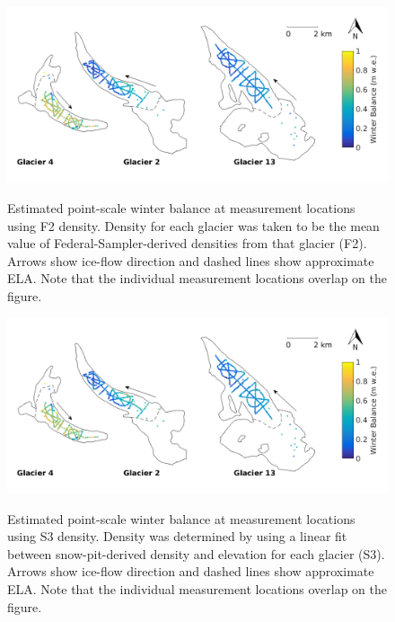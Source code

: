 \documentclass{sfuthesis}
\begin{document}
\begin{figure}[H]
	\centering
	\includegraphics[width = \textwidth]{SWEmap_opt5.png}\\
	\caption[Estimated point-scale winter balance at measurement locations using F2 density]{Estimated point-scale winter balance at measurement locations using F2 density. Density for each glacier was taken to be the mean value of Federal-Sampler-derived densities from that glacier (F2). Arrows show ice-flow direction and dashed lines show approximate ELA. Note that the individual measurement locations overlap on the figure.}
	\label{fig:SWEmap_F2}
\end{figure}

\begin{figure}[H]
	\centering
	\includegraphics[width = \textwidth]{SWEmap_opt6.png}\\
	\caption[Estimated point-scale winter balance at measurement locations using S3 density]{Estimated point-scale winter balance at measurement locations using S3 density. Density was determined by using a linear fit between snow-pit-derived density and elevation for each glacier (S3). Arrows show ice-flow direction and dashed lines show approximate ELA. Note that the individual measurement locations overlap on the figure.}
	\label{fig:SWEmap_S3}
\end{figure}
\end{document}
